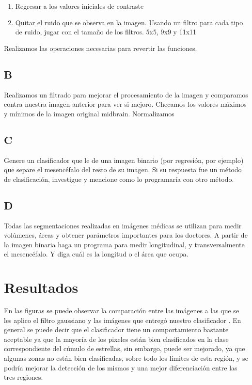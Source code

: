 \documentclass[10pt,journal,compsoc]{IEEEtran}\usepackage[T1]{fontenc}                              %
\begin{document}
\begin{enumerate}
  \item Regresar a los valores iniciales de contraste
  \item Quitar el ruido que se observa en la imagen. Usando un filtro para cada tipo de ruido, jugar con el tamaño de los filtros. 5x5, 9x9 y 11x11
\end{enumerate}

Realizamos las operaciones necesarias para revertir las funciones.

\subsection{B}

Realizamos un filtrado para mejorar el procesamiento de la imagen y comparamos  contra nuestra imagen anterior para ver si mejoro.
Checamos los valores máximos y mínimos de la imagen original midbrain. Normalizamos

\subsection{C}

Genere un clasificador que le de una imagen binario (por regresión, por ejemplo) que separe el mesencéfalo del resto de su imagen. Si su respuesta fue un método de clasificación, investigue y mencione como lo programaría con otro método.

\subsection{D}

Todas las segmentaciones realizadas en imágenes médicas se utilizan para medir volúmenes, áreas y obtener parámetros importantes para los doctores. A partir de la imagen binaria haga un programa para medir longitudinal, y transversalmente el mesencéfalo. Y diga cuál es la longitud o el área que ocupa.

\section{Resultados}


En las figuras se puede observar la comparación entre las imágenes a las que se les aplico el filtro gaussiano y las imágenes que entregó nuestro clasificador .
En general se puede decir que el clasificador tiene un comportamiento bastante aceptable ya que la mayoría de los pixeles están bien clasificados en la clase correspondiente del cúmulo de estrellas, sin embargo, puede ser mejorado, ya que algunas zonas no están bien clasificadas, sobre todo los límites de esta región, y se podría mejorar la detección de los mismos y una mejor diferenciación entre las tres regiones.
\end{document}
